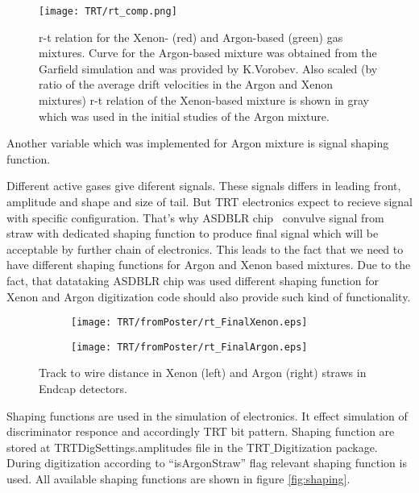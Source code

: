 \begin{figure}
\centering
 \texttt{[image: TRT/rt\_comp.png]}
\caption{r-t relation for the Xenon- (red) and Argon-based (green) gas mixtures. Curve for the Argon-based mixture was obtained from the Garfield simulation and
was provided by K.Vorobev. Also scaled (by ratio of the average drift velocities in the Argon and Xenon mixtures) 
r-t relation of the Xenon-based mixture is shown in gray which was used in the initial studies of the Argon mixture.
}
\label{fig:rt_comp}
\end{figure}

Another variable which was implemented for Argon mixture is signal shaping function. 

Different active gases give diferent signals. These signals differs in leading front, amplitude and shape and size of tail. But TRT electronics expect to recieve signal with specific configuration.
That's why ASDBLR chip~\cite{TRT_electronics} convulve signal from straw with dedicated shaping function to produce final signal which will be acceptable by further chain of electronics. This leads to the fact that we need
to have different shaping functions for Argon and Xenon based mixtures.
Due to the fact, that datataking ASDBLR chip was used different shaping function for Xenon and Argon 
digitization code should also provide such kind of functionality. 

\begin{figure}

\begin{subfigure}{.5\textwidth}
  \centering
  \texttt{[image: TRT/fromPoster/rt\_FinalXenon.eps]}
\end{subfigure}%
\begin{subfigure}{.5\textwidth}
  \centering
  \texttt{[image: TRT/fromPoster/rt\_FinalArgon.eps]}
\end{subfigure}

\caption{Track to wire distance in Xenon (left) and Argon (right) straws in Endcap detectors.}
  \label{fig:RT_xenon_argon}
\end{figure}

Shaping functions are used in the simulation of electronics. It effect simulation of discriminator responce and accordingly TRT bit pattern.
Shaping function are stored at \mbox{TRTDigSettings.amplitudes} file in the \mbox{TRT$\_$Digitization} package. During digitization according to ``isArgonStraw'' flag relevant shaping function is used. 
All available shaping functions are shown in figure \ref{fig:shaping}.

